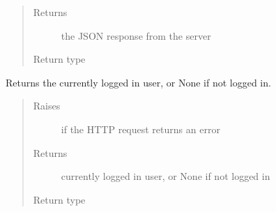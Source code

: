 \documentclass[letterpaper,10pt,english]{sphinxmanual}
\begin{document}
\begin{fulllineitems}
\begin{fulllineitems}
\begin{quote}
\begin{description}
\item[{Returns}] \leavevmode
\sphinxAtStartPar
the JSON response from the server

\item[{Return type}] \leavevmode
\sphinxAtStartPar
{}

\end{description}\end{quote}

\end{fulllineitems}


\begin{fulllineitems}
\label{\detokenize{autoapi/pine/client/client/index:pine.client.client.PineClient.get_logged_in_user}}
\sphinxAtStartPar
Returns the currently logged in user, or None if not logged in.
\begin{quote}\begin{description}
\item[{Raises}] \leavevmode
\sphinxAtStartPar
{\hyperref[\detokenize{autoapi/pine/client/exceptions/index:pine.client.exceptions.PineClientHttpException}]{}} \textendash{} if the HTTP request returns an error

\item[{Returns}] \leavevmode
\sphinxAtStartPar
currently logged in user, or None if not logged in

\item[{Return type}] \leavevmode
\sphinxAtStartPar
{}

\end{description}\end{quote}

\end{fulllineitems}



\end{fulllineitems}
\end{document}
